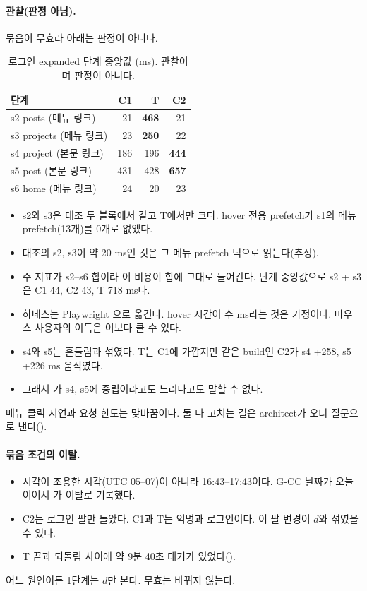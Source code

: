 \paragraph{관찰(판정 아님).}
묶음이 무효라 아래는 판정이 아니다.
\begin{table}[H]
  \caption{로그인 expanded 단계 중앙값 (ms). 관찰이며 판정이 아니다.}
  \label{tab:re-aba-steps}
  \centering\small
  \begin{tabularx}{\linewidth}{@{}Y r r r@{}}
    \toprule
    단계 & C1 & T & C2 \\
    \midrule
    s2 posts (메뉴 링크) & 21 & \textbf{468} & 21 \\
    \midrule
    s3 projects (메뉴 링크) & 23 & \textbf{250} & 22 \\
    \midrule
    s4 project (본문 링크) & 186 & 196 & \textbf{444} \\
    \midrule
    s5 post (본문 링크) & 431 & 428 & \textbf{657} \\
    \midrule
    s6 home (메뉴 링크) & 24 & 20 & 23 \\
    \bottomrule
  \end{tabularx}
\end{table}
\begin{itemize}[nosep]
  \item s2와 s3은 대조 두 블록에서 같고 T에서만 크다. hover 전용 prefetch가 s1의 메뉴 prefetch(13개)를 0개로 없앴다.
  \item 대조의 s2, s3이 약 20 ms인 것은 그 메뉴 prefetch 덕으로 읽는다(추정).
  \item 주 지표가 s2--s6 합이라 이 비용이 합에 그대로 들어간다. 단계 중앙값으로 s2 + s3은 C1 44, C2 43, T 718 ms다.
  \item 하네스는 Playwright 으로 옮긴다. hover 시간이 수 ms라는 것은 가정이다. 마우스 사용자의 이득은 이보다 클 수 있다.
  \item s4와 s5는 흔들림과 섞였다. T는 C1에 가깝지만 같은 build인 C2가 s4 +258, s5 +226 ms 움직였다.
  \item 그래서 가 s4, s5에 중립이라고도 느리다고도 말할 수 없다.
\end{itemize}
메뉴 클릭 지연과 요청 한도는 맞바꿈이다. 둘 다 고치는 길은 architect가 오너 질문으로 낸다().

\paragraph{묶음 조건의 이탈.}
\begin{itemize}[nosep]
  \item 시각이 조용한 시각(UTC 05--07)이 아니라 16:43--17:43이다. G-CC 날짜가 오늘이어서 가 이탈로 기록했다.
  \item C2는 로그인 팔만 돌았다. C1과 T는 익명과 로그인이다. 이 팔 변경이 $d$와 섞였을 수 있다.
  \item T 끝과 되돌림 사이에 약 9분 40초 대기가 있었다().
\end{itemize}
어느 원인이든 1단계는 $d$만 본다. 무효는 바뀌지 않는다.

